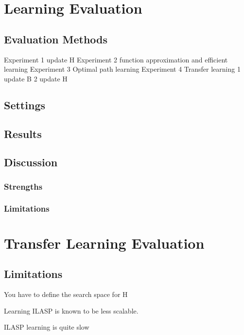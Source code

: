 \section{Learning Evaluation}
\label{learning_evaluation}

\subsection{Evaluation Methods}

Experiment 1 update H
Experiment 2 function approximation and efficient learning
Experiment 3 Optimal path learning
Experiment 4 Transfer learning 
    1 update B
    2 update H

\subsection{Settings}

\subsection{Results}


\subsection{Discussion}
\subsubsection{Strengths}

\subsubsection{Limitations}

\section{Transfer Learning Evaluation}
\label{transfer_learning}

\subsection{Limitations}

You have to define the search space for H

Learning ILASP is known to be less scalable. 

ILASP learning is quite slow